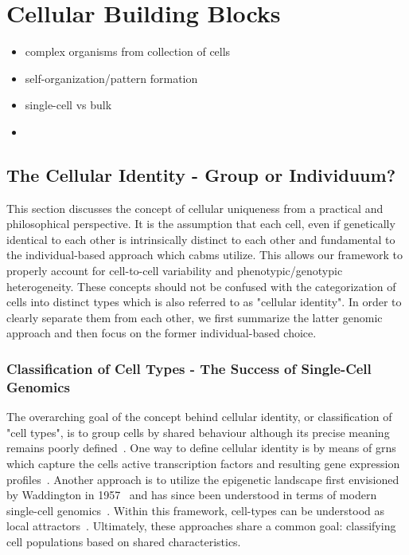 \section{Cellular Building Blocks}
\begin{itemize}
    \item complex organisms from collection of cells
    \item self-organization/pattern formation
    \item single-cell vs bulk
    \item {}
\end{itemize}

\subsection{The Cellular Identity - Group or Individuum?}
This section discusses the concept of cellular uniqueness from a practical and philosophical
perspective.
It is the assumption that each cell, even if genetically identical to each other is intrinsically
distinct to each other and fundamental to the individual-based approach which \acp{cabm} utilize.
This allows our framework to properly account for cell-to-cell variability and phenotypic/genotypic
heterogeneity.
These concepts should not be confused with the categorization of cells into distinct types which is
also referred to as "cellular identity".
In order to clearly separate them from each other, we first summarize the latter genomic approach
and then focus on the former individual-based choice.

\subsubsection{Classification of Cell Types - The Success of Single-Cell Genomics}
The overarching goal of the concept behind cellular identity, or classification of "cell types", is
to group cells by shared behaviour although its precise meaning remains poorly
defined~\cite{Morris2019}.
One way to define cellular identity is by means of \acp{grn} which capture the cells active
transcription factors and resulting gene expression profiles~\cite{Cahan2014}.
Another approach is to utilize the epigenetic landscape first envisioned by Waddington in
1957~\cite{Waddington1958} and has since been understood in terms of modern single-cell
genomics~\cite{Huang2011,Wagner2016}.
Within this framework, cell-types can be understood as local attractors~\cite{Ye2018}.
Ultimately, these approaches share a common goal: classifying cell populations based on shared
characteristics.

